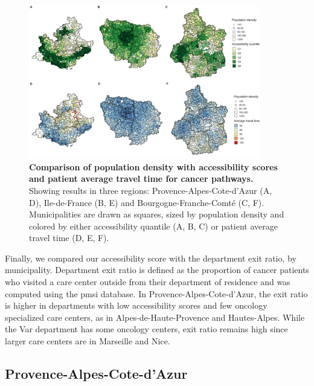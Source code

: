 \begin{figure}[H]
    \includegraphics[width=0.9\textwidth]{images/camion/fig3_accessibility_vs_density_scatter_map.png}
    \centering
    \caption{ \textbf{Comparison of population density with accessibility scores
            and patient average travel time for cancer pathways.} Showing results in
        three regions: Provence-Alpes-Cote-d'Azur (A, D), Ile-de-France (B, E)
        and Bourgogne-Franche-Comté (C, F). Municipalities are drawn as squares,
        sized by population density and colored by either accessibility quantile
        (A, B, C) or patient average travel time (D, E, F). }
    \label{fig:accessibility-vs-density}
\end{figure}

Finally, we compared our accessibility score with the department exit ratio, by
municipality. Department exit ratio is defined as the proportion of cancer
patients who visited a care center outside from their department of residence
and was computed using the \ac{pmsi} database. In Provence-Alpes-Cote-d'Azur,
the exit ratio is higher in departments with low accessibility scores and few
oncology specialized care centers, as in Alpes-de-Haute-Provence and
Hautes-Alpes. While the Var department has some oncology centers, exit ratio
remains high since larger care centers are in Marseille and Nice.

\subsection*{Provence-Alpes-Cote-d'Azur}

